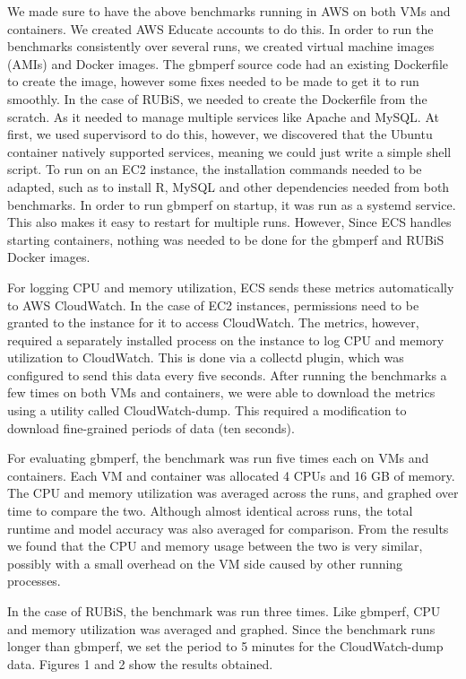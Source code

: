\documentclass[11pt]{article}
\begin{document}
We made sure to have the above benchmarks running in AWS on both VMs and containers. We created AWS Educate accounts to do this. In order to run the benchmarks consistently over several runs, we created virtual machine images (AMIs) and Docker images. The gbmperf source code had an existing Dockerfile to create the image, however some fixes needed to be made to get it to run smoothly. In the case of RUBiS, we needed to create the Dockerfile from the scratch. As it needed to manage multiple services like Apache and MySQL. At first, we used supervisord to do this, however, we discovered that the Ubuntu container natively supported services, meaning we could just write a simple shell script. To run on an EC2 instance, the installation commands needed to be adapted, such as to install R, MySQL and other dependencies needed from both benchmarks. In order to run gbmperf on startup, it was run as a systemd service. This also makes it easy to restart for multiple runs. However, Since ECS handles starting containers, nothing was needed to be done for the gbmperf and RUBiS Docker images.

For logging CPU and memory utilization, ECS sends these metrics automatically to AWS CloudWatch. In the case of EC2 instances, permissions need to be granted to the instance for it to access CloudWatch. The metrics, however, required a separately installed process on the instance to log CPU and memory utilization to CloudWatch. This is done via a collectd plugin, which was configured to send this data every five seconds. After running the benchmarks a few times on both VMs and containers, we were able to download the metrics using a utility called CloudWatch-dump. This required a modification to download fine-grained periods of data (ten seconds).

For evaluating gbmperf, the benchmark was run five times each on VMs and containers. Each VM and container was allocated 4 CPUs and 16 GB of memory. The CPU and memory utilization was averaged across the runs, and graphed over time to compare the two. Although almost identical across runs, the total runtime and model accuracy was also averaged for comparison. From the results we found that the CPU and memory usage between the two is very similar, possibly with a small overhead on the VM side caused by other running processes.

In the case of RUBiS, the benchmark was run three times. Like gbmperf, CPU and memory utilization was averaged and graphed. Since the benchmark runs longer than gbmperf, we set the period to 5 minutes for the CloudWatch-dump data. Figures 1 and 2 show the results obtained.
\end{document}
